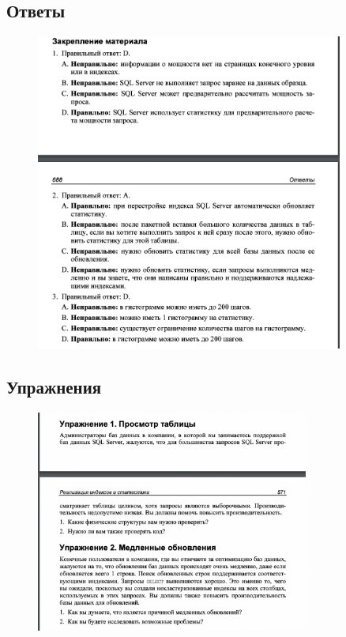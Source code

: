 \subsection*{Ответы}

\begin{figure}[h!]
	\begin{center}
		\includegraphics[width=0.9\textwidth]{img/ans45.png}
	\end{center}
	\captionsetup{justification=centering}
\end{figure}


\newpage
\subsection*{Упражнения}

\begin{figure}[h!]
	\begin{center}
		\includegraphics[width=0.8\textwidth]{img/ex19.png}
	\end{center}
	\captionsetup{justification=centering}
\end{figure}

